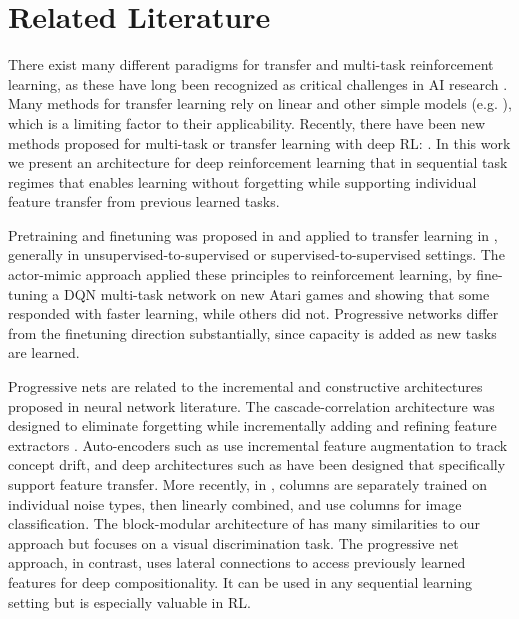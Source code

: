 \section{Related Literature}

There exist many different paradigms for transfer and
multi-task reinforcement learning, as these have long been recognized 
as critical challenges in AI research
\cite{Ring1995,SilverYL13,AAAIMag11-Taylor}. Many methods for transfer
learning rely on linear and other simple models
(e.g. \citep{Ruvolo2013ELLA}), which is a limiting factor to their
applicability. Recently, there have been new methods proposed for
multi-task or transfer learning with deep RL:
\cite{tessler2016,Rusu15,ParisottoICLR16}. In this
work we present an architecture for deep reinforcement learning that
in sequential task regimes that enables learning without forgetting
while supporting individual feature transfer from previous
learned tasks.

Pretraining and finetuning was proposed in \citep{hinton2006science}
and applied to transfer learning in
\citep{Bengio12deeplearning,UTLC+LISA-2011}, generally
in unsupervised-to-supervised or supervised-to-supervised
settings. The actor-mimic approach
\cite{ParisottoICLR16} applied these principles to
reinforcement learning, by fine-tuning a DQN multi-task network on new
Atari games and showing that some responded with faster learning,
while others did not. Progressive networks differ from the
finetuning direction substantially, since capacity is added as new tasks are learned.

Progressive nets are related to the incremental and constructive
architectures proposed in neural network literature. The
cascade-correlation architecture was designed to eliminate forgetting
while incrementally adding and refining feature extractors
\cite{Fahlman1990}.  Auto-encoders such as \citep{ZhouAISTATS12} use
incremental feature augmentation to track concept drift, and deep
architectures such as \citep{RozantsevSF16} have been designed that
specifically support feature transfer.  More recently, in
\cite{Agostinelli_NIPS2013}, columns are separately trained on
individual noise types, then linearly combined, and 
\cite{CiresanMS12} use columns for image classification. The block-modular architecture of \cite{Terekhov2015} has many similarities to our approach but focuses on a visual discrimination task.
The progressive net approach, in contrast, uses lateral connections to access previously learned features for deep compositionality. It can be used in any sequential learning setting but is especially valuable in RL.
